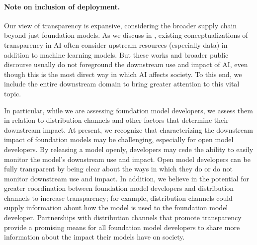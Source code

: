 \paragraph{Note on inclusion of deployment.}
Our view of transparency is expansive, considering the broader supply chain beyond just foundation models.
As we discuss in , existing conceptualizations of transparency in AI often consider upstream resources (especially data) in addition to machine learning models.
But these works and broader public discourse usually do not foreground the downstream use and impact of AI, even though this is the most direct way in which AI affects society.
To this end, we include the entire downstream domain to bring greater attention to this vital topic.

In particular, while we are assessing foundation model developers, we assess them in relation to distribution channels and other factors that determine their downstream impact.
At present, we recognize that characterizing the downstream impact of foundation models may be challenging, especially for open model developers.
By releasing a model openly, developers may cede the ability to easily monitor the model's downstream use and impact.
Open model developers can be fully transparent by being clear about the ways in which they do or do not monitor downstream use and impact.
In addition, we believe in the potential for greater coordination between foundation model developers and distribution channels to increase transparency; for example, distribution channels could supply information about how the model is used to the foundation model developer.
Partnerships with distribution channels that promote transparency provide a promising means for all foundation model developers to share more information about the impact their models have on society.